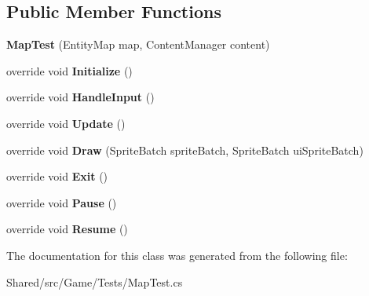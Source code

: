 \subsection*{Public Member Functions}
\begin{DoxyCompactItemize}
\item 
\hypertarget{class_midnight_blue_1_1_testing_1_1_map_test_a7fb98572efcce64a85eaec1363fdddd4}{}\label{class_midnight_blue_1_1_testing_1_1_map_test_a7fb98572efcce64a85eaec1363fdddd4} 
{\bfseries Map\+Test} (Entity\+Map map, Content\+Manager content)
\item 
\hypertarget{class_midnight_blue_1_1_testing_1_1_map_test_adcaa2f37efbf5764b48d297cabf17784}{}\label{class_midnight_blue_1_1_testing_1_1_map_test_adcaa2f37efbf5764b48d297cabf17784} 
override void {\bfseries Initialize} ()
\item 
\hypertarget{class_midnight_blue_1_1_testing_1_1_map_test_ad7e54e4aec415ccf6e89ce8a8876d259}{}\label{class_midnight_blue_1_1_testing_1_1_map_test_ad7e54e4aec415ccf6e89ce8a8876d259} 
override void {\bfseries Handle\+Input} ()
\item 
\hypertarget{class_midnight_blue_1_1_testing_1_1_map_test_ae4bb817dd9c5b55bd1d818de9f527c7c}{}\label{class_midnight_blue_1_1_testing_1_1_map_test_ae4bb817dd9c5b55bd1d818de9f527c7c} 
override void {\bfseries Update} ()
\item 
\hypertarget{class_midnight_blue_1_1_testing_1_1_map_test_a03d0a9349662afafaa301a8581fbf01f}{}\label{class_midnight_blue_1_1_testing_1_1_map_test_a03d0a9349662afafaa301a8581fbf01f} 
override void {\bfseries Draw} (Sprite\+Batch sprite\+Batch, Sprite\+Batch ui\+Sprite\+Batch)
\item 
\hypertarget{class_midnight_blue_1_1_testing_1_1_map_test_a7dfcf609b9fd898f377297a0075d2159}{}\label{class_midnight_blue_1_1_testing_1_1_map_test_a7dfcf609b9fd898f377297a0075d2159} 
override void {\bfseries Exit} ()
\item 
\hypertarget{class_midnight_blue_1_1_testing_1_1_map_test_a7dba960137d634b15e4f4b7b3a86489f}{}\label{class_midnight_blue_1_1_testing_1_1_map_test_a7dba960137d634b15e4f4b7b3a86489f} 
override void {\bfseries Pause} ()
\item 
\hypertarget{class_midnight_blue_1_1_testing_1_1_map_test_aa595402e6d3702119877721f7cb3ab9f}{}\label{class_midnight_blue_1_1_testing_1_1_map_test_aa595402e6d3702119877721f7cb3ab9f} 
override void {\bfseries Resume} ()
\end{DoxyCompactItemize}


The documentation for this class was generated from the following file\+:\begin{DoxyCompactItemize}
\item 
Shared/src/\+Game/\+Tests/Map\+Test.\+cs\end{DoxyCompactItemize}
